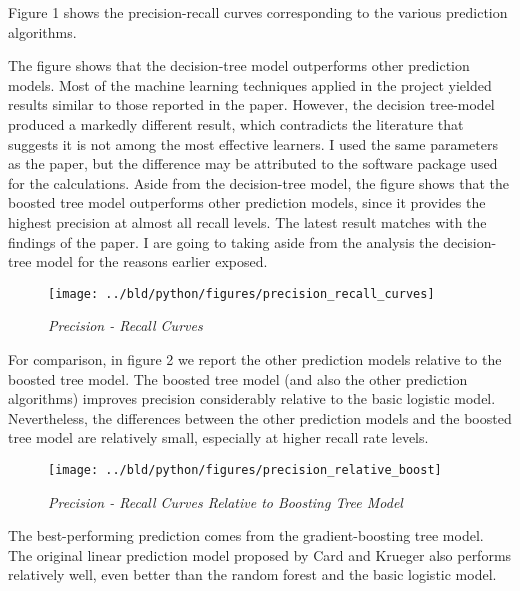 \documentclass[11pt, a4paper, leqno]{article}
\begin{document}
Figure 1 shows the precision-recall curves 
corresponding to the various prediction algorithms. 

The ﬁgure shows that the decision-tree model outperforms other
prediction models. Most of the machine learning techniques applied 
in the project yielded results similar to those reported in the paper. 
However, the decision tree-model produced a markedly different result, 
which contradicts the literature that suggests it is not among the 
most effective learners. I used the same parameters as the paper, 
but the difference may be attributed to the software package used 
for the calculations. Aside from the decision-tree model, 
the ﬁgure shows that the boosted tree model outperforms other
prediction models, since it provides the highest precision at almost all recall
levels. The latest result matches with the findings of the paper.
I are going to taking aside from the analysis the decision-tree model
for the reasons earlier exposed.

\begin{figure}[H]

    \centering
    \texttt{[image: ../bld/python/figures/precision\_recall\_curves]}

    \caption{\emph{Precision - Recall Curves}}
    \label{fig:precision-recall}

\end{figure}

For comparison, in ﬁgure 2 we report 
the other prediction models relative to the boosted tree model. 
The boosted tree model (and also the other
prediction algorithms) improves precision considerably relative to the basic
logistic model. Nevertheless, the differences between the other prediction
models and the boosted tree model are relatively small, especially at higher
recall rate levels. 

\begin{figure}[H]
    \centering
    \texttt{[image: ../bld/python/figures/precision\_relative\_boost]}
    \caption{\emph{Precision - Recall Curves Relative to Boosting Tree Model}}
    \label{fig:precision-relative}

\end{figure}

The best-performing prediction comes from the gradient-boosting tree
model. The original linear prediction model proposed by Card and Krueger
also performs relatively well, even better than the random forest
and the basic logistic model.
\end{document}
